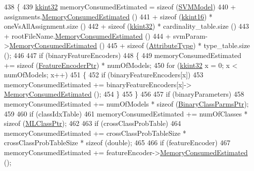 \begin{DoxyCode}
438 \{
439   \hyperlink{namespace_k_k_b_a8fa4952cc84fda1de4bec1fbdd8d5b1b}{kkint32}  memoryConsumedEstimated = \textcolor{keyword}{sizeof} (\hyperlink{class_k_k_m_l_l_1_1_s_v_m_model_ac71a4eca05bef68550eb076582bc90d5}{SVMModel})
440        + assignments.\hyperlink{class_k_k_m_l_l_1_1_class_assignments_a9fa44a1925ecd559e96d49a7f4873c27}{MemoryConsumedEstimated} ()
441        + \textcolor{keyword}{sizeof} (\hyperlink{namespace_k_k_b_a93809780ee294124dda4c23069f41248}{kkint16}) * oneVsAllAssignment.size ()
442        + \textcolor{keyword}{sizeof} (\hyperlink{namespace_k_k_b_a8fa4952cc84fda1de4bec1fbdd8d5b1b}{kkint32}) * cardinality\_table.size ()
443        + rootFileName.\hyperlink{class_k_k_b_1_1_k_k_str_afc335bf98a8d4a77dc34215e72068719}{MemoryConsumedEstimated} ()
444        + svmParam->\hyperlink{class_k_k_m_l_l_1_1_s_v_mparam_a8338dec54ee6c5cb7b37a6f809913e35}{MemoryConsumedEstimated} ()
445        + \textcolor{keyword}{sizeof} (\hyperlink{namespace_k_k_m_l_l_a99973706982b59debba670e2480555ab}{AttributeType}) * type\_table.size ();
446 
447   \textcolor{keywordflow}{if}  (binaryFeatureEncoders)
448   \{
449     memoryConsumedEstimated += \textcolor{keyword}{sizeof} (\hyperlink{namespace_k_k_m_l_l_a72cdf9beec1c671ef814e86c1df34874}{FeatureEncoderPtr}) * numOfModels;
450     \textcolor{keywordflow}{for}  (\hyperlink{namespace_k_k_b_a8fa4952cc84fda1de4bec1fbdd8d5b1b}{kkint32} x = 0;  x < numOfModels;  x++)
451     \{
452       \textcolor{keywordflow}{if}  (binaryFeatureEncoders[x])
453         memoryConsumedEstimated += binaryFeatureEncoders[x]->
      \hyperlink{class_k_k_m_l_l_1_1_feature_encoder_aed7fd3271e7ce09181205874048ef9e8}{MemoryConsumedEstimated} ();
454     \}
455   \}
456 
457   \textcolor{keywordflow}{if}  (binaryParameters)
458     memoryConsumedEstimated += numOfModels * \textcolor{keyword}{sizeof} (\hyperlink{namespace_k_k_m_l_l_aca399c0744e11553270ffaca507cfee7}{BinaryClassParmsPtr});
459 
460   \textcolor{keywordflow}{if}  (classIdxTable)
461     memoryConsumedEstimated += numOfClasses * \textcolor{keyword}{sizeof} (\hyperlink{namespace_k_k_m_l_l_ac272393853d59e72e8456f14cd6d8c23}{MLClassPtr});
462 
463   \textcolor{keywordflow}{if}  (crossClassProbTable)
464     memoryConsumedEstimated += crossClassProbTableSize * crossClassProbTableSize * \textcolor{keyword}{sizeof} (double);
465 
466   \textcolor{keywordflow}{if}  (featureEncoder)
467     memoryConsumedEstimated += featureEncoder->\hyperlink{class_k_k_m_l_l_1_1_feature_encoder_aed7fd3271e7ce09181205874048ef9e8}{MemoryConsumedEstimated} ();

\end{DoxyCode}
